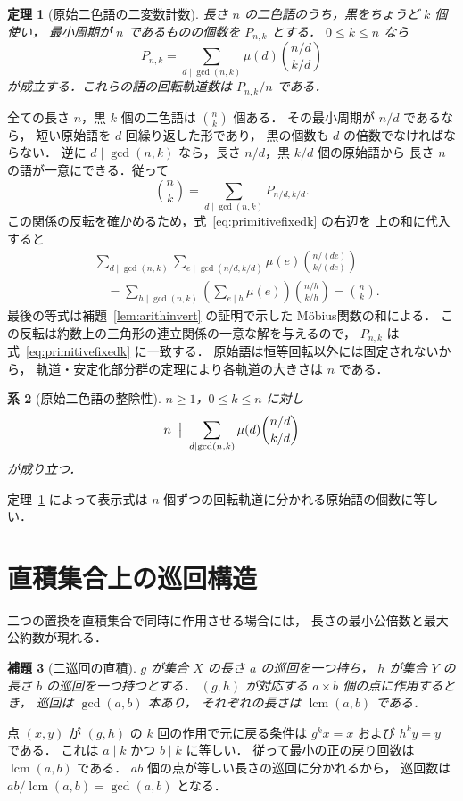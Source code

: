 \documentclass[a5paper,10pt,onecolumn]{jsarticle}
\makeatletter
\theoremstyle{mathnotetheorem}
\newtheorem{theorem}{定理}[section]
\newtheorem{lemma}[theorem]{補題}
\newtheorem{corollary}[theorem]{系}
\renewcommand{\proofname}{証明}
\renewenvironment{proof}[1][\proofname]{%
  \par\pushQED{\qed}\normalfont\topsep4\p@\@plus2\p@\relax
  \trivlist\item[\hskip\labelsep\bfseries #1]\ignorespaces
}{\popQED\endtrivlist\@endpefalse}
\makeatother
\begin{document}
\begin{theorem}[原始二色語の二変数計数]\label{thm:binaryprimitive}
長さ $n$ の二色語のうち，黒をちょうど $k$ 個使い，
最小周期が $n$ であるものの個数を $P_{n,k}$ とする．
$0\le k\le n$ なら
\begin{equation}\label{eq:primitivefixedk}
 P_{n,k}=\sum_{d\mid\gcd(n,k)}
 \mu(d){n/d\choose k/d}
\end{equation}
が成立する．これらの語の回転軌道数は $P_{n,k}/n$ である．
\end{theorem}
\begin{proof}
全ての長さ $n$，黒 $k$ 個の二色語は ${n\choose k}$ 個ある．
その最小周期が $n/d$ であるなら，
短い原始語を $d$ 回繰り返した形であり，
黒の個数も $d$ の倍数でなければならない．
逆に $d\mid\gcd(n,k)$ なら，長さ $n/d$，黒 $k/d$ 個の原始語から
長さ $n$ の語が一意にできる．従って
\[
 {n\choose k}=\sum_{d\mid\gcd(n,k)}P_{n/d,k/d}.
\]
この関係の反転を確かめるため，式~\eqref{eq:primitivefixedk} の右辺を
上の和に代入すると
\[
 \begin{aligned}
 &\sum_{d\mid\gcd(n,k)}
  \sum_{e\mid\gcd(n/d,k/d)}
  \mu(e){n/(de)\choose k/(de)}\\
 &\quad=\sum_{h\mid\gcd(n,k)}
 \left(\sum_{e\mid h}\mu(e)\right){n/h\choose k/h}
 ={n\choose k}.
 \end{aligned}
\]
最後の等式は補題~\ref{lem:arithinvert} の証明で示した
M\"obius関数の和による．
この反転は約数上の三角形の連立関係の一意な解を与えるので，
$P_{n,k}$ は式~\eqref{eq:primitivefixedk} に一致する．
原始語は恒等回転以外には固定されないから，
軌道・安定化部分群の定理により各軌道の大きさは $n$ である．
\end{proof}

\begin{corollary}[原始二色語の整除性]
$n\ge1$，$0\le k\le n$ に対し
\[
 n\;\bigm|\;\sum_{d\mid\gcd(n,k)}
 \mu(d){n/d\choose k/d}
\]
が成り立つ．
\end{corollary}
\begin{proof}
定理~\ref{thm:binaryprimitive} によって表示式は
$n$ 個ずつの回転軌道に分かれる原始語の個数に等しい．
\end{proof}

\section{直積集合上の巡回構造}
二つの置換を直積集合で同時に作用させる場合には，
長さの最小公倍数と最大公約数が現れる．

\begin{lemma}[二巡回の直積]\label{lem:productcycles}
$g$ が集合 $X$ の長さ $a$ の巡回を一つ持ち，
$h$ が集合 $Y$ の長さ $b$ の巡回を一つ持つとする．
$(g,h)$ が対応する $a\times b$ 個の点に作用するとき，
巡回は $\gcd(a,b)$ 本あり，
それぞれの長さは $\operatorname{lcm}(a,b)$ である．
\end{lemma}
\begin{proof}
点 $(x,y)$ が $(g,h)$ の $k$ 回の作用で元に戻る条件は
$g^kx=x$ および $h^ky=y$ である．
これは $a\mid k$ かつ $b\mid k$ に等しい．
従って最小の正の戻り回数は $\operatorname{lcm}(a,b)$ である．
$ab$ 個の点が等しい長さの巡回に分かれるから，
巡回数は
$ab/\operatorname{lcm}(a,b)=\gcd(a,b)$ となる．
\end{proof}
\end{document}
